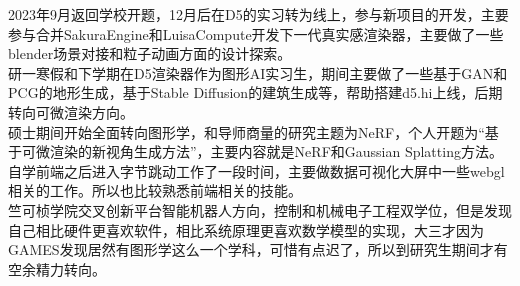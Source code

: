 \hspace{-2.4pt}
    {2023年9月返回学校开题，12月后在D5的实习转为线上，参与新项目的开发，主要参与合并SakuraEngine和LuisaCompute开发下一代真实感渲染器，主要做了一些blender场景对接和粒子动画方面的设计探索。}
    \vspace{\itemspace}\\
    {研一寒假和下学期在D5渲染器作为图形AI实习生，期间主要做了一些基于GAN和PCG的地形生成，基于Stable Diffusion的建筑生成等，帮助搭建d5.hi上线，后期转向可微渲染方向。}
    \vspace{\itemspace}\\
{硕士期间开始全面转向图形学，和导师商量的研究主题为NeRF，个人开题为“基于可微渲染的新视角生成方法”，主要内容就是NeRF和Gaussian Splatting方法。}
\vspace{\itemspace}\\

{自学前端之后进入字节跳动工作了一段时间，主要做数据可视化大屏中一些webgl相关的工作。所以也比较熟悉前端相关的技能。}
\vspace{\itemspace}\\
{竺可桢学院交叉创新平台智能机器人方向，控制和机械电子工程双学位，但是发现自己相比硬件更喜欢软件，相比系统原理更喜欢数学模型的实现，大三才因为GAMES发现居然有图形学这么一个学科，可惜有点迟了，所以到研究生期间才有空余精力转向。}
\vspace{0.3cm}\\